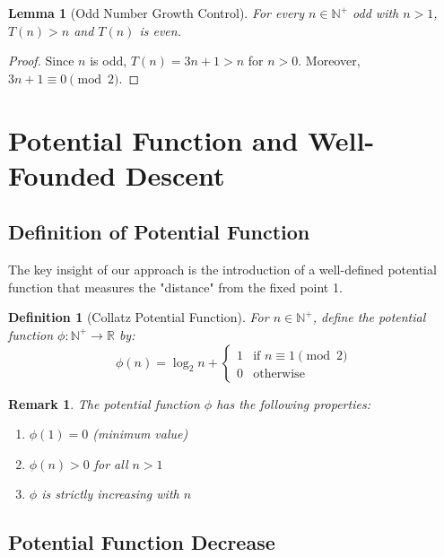 \documentclass[11pt,a4paper]{article}
\newtheorem{lemma}[theorem]{Lemma}
\newtheorem{definition}[theorem]{Definition}
\newtheorem{remark}[theorem]{Remark}
\begin{document}
\begin{lemma}[Odd Number Growth Control]
For every $n \in \mathbb{N}^+$ odd with $n > 1$, $T(n) > n$ and $T(n)$ is even.
\end{lemma}

\begin{proof}
Since $n$ is odd, $T(n) = 3n + 1 > n$ for $n > 0$. Moreover, $3n + 1 \equiv 0 \pmod{2}$.
\end{proof}

\section{Potential Function and Well-Founded Descent}

\subsection{Definition of Potential Function}

The key insight of our approach is the introduction of a well-defined potential function that measures the "distance" from the fixed point 1.

\begin{definition}[Collatz Potential Function]
For $n \in \mathbb{N}^+$, define the potential function $\phi: \mathbb{N}^+ \rightarrow \mathbb{R}$ by:
\begin{equation}
\phi(n) = \log_2 n + \begin{cases}
1 & \text{if } n \equiv 1 \pmod{2} \\
0 & \text{otherwise}
\end{cases}
\end{equation}
\end{definition}

\begin{remark}
The potential function $\phi$ has the following properties:
\begin{enumerate}
\item $\phi(1) = 0$ (minimum value)
\item $\phi(n) > 0$ for all $n > 1$
\item $\phi$ is strictly increasing with $n$
\end{enumerate}
\end{remark}

\subsection{Potential Function Decrease}
\end{document}
